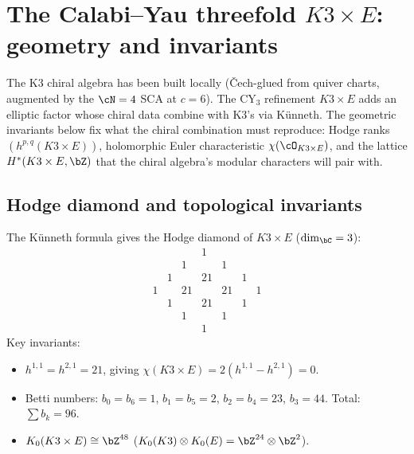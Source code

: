


\section{The Calabi--Yau threefold \texorpdfstring{$K3 \times E$}{K3 x E}:
geometry and invariants}
\label{sec:k3xe-geometry}

The K3 chiral algebra has been built locally
\textup{(}\v{C}ech-glued from quiver charts, augmented by the
$\cN=4$ SCA at $c = 6$\textup{)}. The CY$_3$ refinement
$K3 \times E$ adds an elliptic factor whose chiral data combine
with K3's via Künneth. The geometric invariants below fix what
the chiral combination must reproduce: Hodge ranks
$(h^{p,q}(K3 \times E))$, holomorphic Euler characteristic
$\chi(\cO_{K3 \times E})$, and the lattice $H^*(K3 \times E,\bZ)$
that the chiral algebra's modular characters will pair with.

\subsection{Hodge diamond and topological invariants}
\label{subsec:hodge-k3xe}

\begin{proposition}
\label{prop:hodge-k3xe}
The K\"unneth formula gives the Hodge diamond of
$K3 \times E$ \textup{(}$\dim_\bC = 3$\textup{)}:
\[
\renewcommand{\arraystretch}{1.1}
\begin{array}{ccccccc}
& & & 1 & & & \\
& & 1 & & 1 & & \\
& 1 & & 21 & & 1 & \\
1 & & 21 & & 21 & & 1 \\
& 1 & & 21 & & 1 & \\
& & 1 & & 1 & & \\
& & & 1 & & &
\end{array}
\]
Key invariants:
\begin{itemize}
\item $h^{1,1} = h^{2,1} = 21$, giving
 $\chi(K3 \times E) = 2(h^{1,1} - h^{2,1}) = 0$.
\item Betti numbers: $b_0 = b_6 = 1$, $b_1 = b_5 = 2$,
 $b_2 = b_4 = 23$, $b_3 = 44$. Total: $\sum b_k = 96$.
\item $K_0(K3 \times E) \cong \bZ^{48}$
 \textup{(}$K_0(K3) \otimes K_0(E) = \bZ^{24} \otimes \bZ^2$\textup{)}.
\end{itemize}
\end{proposition}

